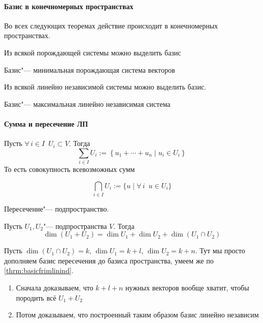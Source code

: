 \documentclass[12pt]{../../../notes}
\begin{document}
\paragraph{Базис в конечномерных пространствах}
Во всех следующих теоремах действие происходит в конечномерных пространствах.

\begin{thrm}\label{thrm:basisfromspan}
  Из всякой порождающей системы можно выделить базис
\end{thrm}

\begin{imp}
  Базис"--- минимальная порождающая система векторов
\end{imp}

\begin{thrm}\label{thrm:basicfrimlinind}
  Из всякой линейно независимой системы можно выделить базис.
\end{thrm}
\begin{imp}
  Базис"--- максимальная линейно независимая система
\end{imp}

\paragraph{Сумма и пересечение ЛП}
\begin{defn}\label{defn:linspsum}
  Пусть $\forall\, i \in I \;\: U_i \subset V$. Тогда 
  \[
    \sum_{i\in I} U_i := \left\{ u_{1} + \dotsb + u_{n} \mid u_{i} \in U_i\right\}
  \]
  То есть совокупность всевозможных сумм
\end{defn}
\begin{defn}\label{defn:linspintersec}
  \[
    \bigcap_{i\in I} U_i := \{u \mid \forall\, i \;\: u \in U_i\}
  \]
\end{defn}

\begin{rem*}
  Пересечение"--- подпространство.
\end{rem*}

\begin{thrm}\label{thrm:dimsumlinsp}
  Пусть $U_1, U_2 $"--- подпространства $V$.
  Тогда
  \[
    \dim (U_1+U_2) = \dim U_1 + \dim U_2 + \dim (U_1 \cap U_2)
  \]
\end{thrm}
\begin{ittproof}
  Пусть $\dim(U_1 \cap U_2) = k$, $\dim U_1 = k + l$, $\dim U_2 = k + n$. Тут мы просто дополняем
  базис пересечения до базиса пространства, умеем же по \ref{thrm:basicfrimlinind}.
  \begin{enumerate}
    \item Сначала доказываем, что $k + l + n$ нужных векторов вообще хватит, чтобы породить всё
      $U_1 + U_2$
    \item Потом доказываем, что построенный таким образом базис линейно независим
  \end{enumerate}
\end{ittproof}
\end{document}
